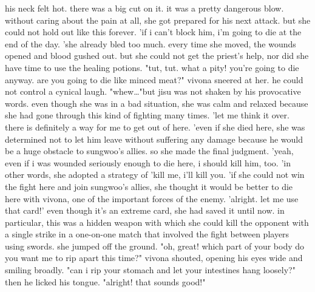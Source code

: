 his neck felt hot.
 there was a big cut on it.
 it was a pretty dangerous blow.
without caring about the pain at all, she got prepared for his next attack.
but she could not hold out like this forever.
'if i can't block him, i'm going to die at the end of the day.
'she already bled too much.
 every time she moved, the wounds opened and blood gushed out.
 but she could not get the priest's help, nor did she have time to use the healing potions.
"tut, tut.
 what a pity! you're going to die anyway.
 are you going to die like minced meat?" vivona sneered at her.
 he could not control a cynical laugh.
"whew…"but jisu was not shaken by his provocative words.
 even though she was in a bad situation, she was calm and relaxed because she had gone through this kind of fighting many times.
'let me think it over.
 there is definitely a way for me to get out of here.
'even if she died here, she was determined not to let him leave without suffering any damage because he would be a huge obstacle to sungwoo's allies.
so she made the final judgment.
'yeah, even if i was wounded seriously enough to die here, i should kill him, too.
'in other words, she adopted a strategy of 'kill me, i'll kill you.
'if she could not win the fight here and join sungwoo's allies, she thought it would be better to die here with vivona, one of the important forces of the enemy.
'alright.
 let me use that card!' even though it's an extreme card, she had saved it until now.
in particular, this was a hidden weapon with which she could kill the opponent with a single strike in a one-on-one match that involved the fight between players using swords.
she jumped off the ground.
"oh, great! which part of your body do you want me to rip apart this time?" vivona shouted, opening his eyes wide and smiling broadly.
 "can i rip your stomach and let your intestines hang loosely?" then he licked his tongue.
"alright! that sounds good!"

 